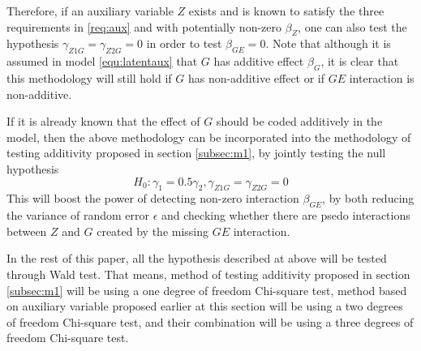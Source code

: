Therefore, if an auxiliary variable $Z$ exists and is known to satisfy the three requirements in \ref{req:aux} and with potentially non-zero $\beta_Z$, one can also test the hypothesis $\gamma_{Z1G} = \gamma_{Z2G} = 0$ in order to test $\beta_{GE} = 0$. Note that although it is assumed in model \ref{equ:latentaux} that $G$ has additive effect $\beta_G$, it is clear that this methodology will still hold if $G$ has non-additive effect or if $GE$ interaction is non-additive.

If it is already known that the effect of $G$ should be coded additively in the model, then the above methodology can be incorporated into the methodology of testing additivity proposed in section \ref{subsec:m1}, by jointly testing the null hypothesis $$ H_0: \gamma_1 = 0.5 \gamma_2, \gamma_{Z1G} = \gamma_{Z2G} = 0$$ This will boost the power of detecting non-zero interaction $\beta_{GE}$, by both reducing the variance of random error $\epsilon$ and checking whether there are psedo interactions between $Z$ and $G$ created by the missing $GE$ interaction.

In the rest of this paper, all the hypothesis described at above will be tested through Wald test. That means, method of testing additivity proposed in section \ref{subsec:m1} will be using a one degree of freedom Chi-square test, method based on auxiliary variable proposed earlier at this section will be using a two degrees of freedom Chi-square test, and their combination will be using a three degrees of freedom Chi-square test.

